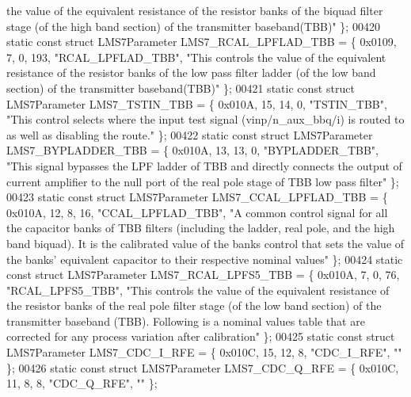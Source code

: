\begin{DoxyCode}
{       the value of the equivalent resistance of the resistor banks of the biquad filter stage (of the high band
       section) of the transmitter baseband(TBB)"} \};
00420 \textcolor{keyword}{static} \textcolor{keyword}{const} \textcolor{keyword}{struct }LMS7Parameter LMS7_RCAL_LPFLAD_TBB = \{ 0x0109, 7, 0, 193, \textcolor{stringliteral}{"RCAL\_LPFLAD\_TBB"}, \textcolor{stringliteral}{"This
       controls the value of the equivalent resistance of the resistor banks of the low pass filter ladder (of the low
       band section) of the transmitter baseband(TBB)"} \};
00421 \textcolor{keyword}{static} \textcolor{keyword}{const} \textcolor{keyword}{struct }LMS7Parameter LMS7_TSTIN_TBB = \{ 0x010A, 15, 14, 0, \textcolor{stringliteral}{"TSTIN\_TBB"}, \textcolor{stringliteral}{"This control selects
       where the input test signal (vinp/n\_aux\_bbq/i) is routed to as well as disabling the route."} \};
00422 \textcolor{keyword}{static} \textcolor{keyword}{const} \textcolor{keyword}{struct }LMS7Parameter LMS7_BYPLADDER_TBB = \{ 0x010A, 13, 13, 0, \textcolor{stringliteral}{"BYPLADDER\_TBB"}, \textcolor{stringliteral}{"This signal
       bypasses the LPF ladder of TBB and directly connects the output of current amplifier to the null port of the
       real pole stage of TBB low pass filter"} \};
00423 \textcolor{keyword}{static} \textcolor{keyword}{const} \textcolor{keyword}{struct }LMS7Parameter LMS7_CCAL_LPFLAD_TBB = \{ 0x010A, 12, 8, 16, \textcolor{stringliteral}{"CCAL\_LPFLAD\_TBB"}, \textcolor{stringliteral}{"A common
       control signal for all the capacitor banks of TBB filters (including the ladder, real pole, and the high
       band biquad). It is the calibrated value of the banks control that sets the value of the banks' equivalent
       capacitor to their respective nominal values"} \};
00424 \textcolor{keyword}{static} \textcolor{keyword}{const} \textcolor{keyword}{struct }LMS7Parameter LMS7_RCAL_LPFS5_TBB = \{ 0x010A, 7, 0, 76, \textcolor{stringliteral}{"RCAL\_LPFS5\_TBB"}, \textcolor{stringliteral}{"This
       controls the value of the equivalent resistance of the resistor banks of the real pole filter stage (of the low
       band section) of the transmitter baseband (TBB). Following is a nominal values table that are corrected for any
       process variation after calibration"} \};
00425 \textcolor{keyword}{static} \textcolor{keyword}{const} \textcolor{keyword}{struct }LMS7Parameter LMS7_CDC_I_RFE = \{ 0x010C, 15, 12, 8, \textcolor{stringliteral}{"CDC\_I\_RFE"}, \textcolor{stringliteral}{""} \};
00426 \textcolor{keyword}{static} \textcolor{keyword}{const} \textcolor{keyword}{struct }LMS7Parameter LMS7_CDC_Q_RFE = \{ 0x010C, 11, 8, 8, \textcolor{stringliteral}{"CDC\_Q\_RFE"}, \textcolor{stringliteral}{""} \};

\end{DoxyCode}
